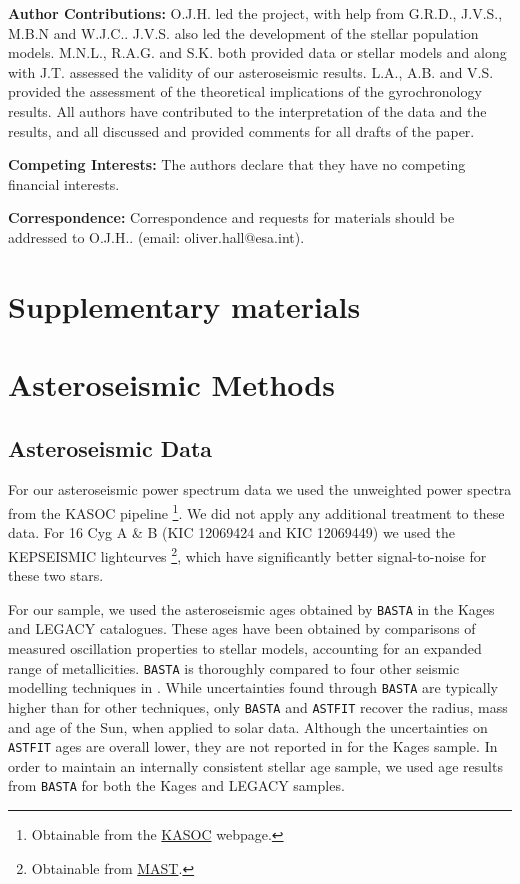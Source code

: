 \documentclass[12pt]{article}
\begin{document}
%

\textbf{Author Contributions:} O.J.H. led the project, with help from G.R.D., J.V.S., M.B.N and W.J.C.. J.V.S. also led the development of the stellar population models. M.N.L., R.A.G. and S.K. both provided data or stellar models and along with J.T. assessed the validity of our asteroseismic results. L.A., A.B. and V.S. provided the assessment of the theoretical implications of the gyrochronology results. All authors have contributed to the interpretation of the data and the results, and all discussed and provided comments for all drafts of the paper.

\textbf{Competing Interests:} The authors declare that they have no competing financial interests.

\textbf{Correspondence:} Correspondence and requests for materials should be addressed to O.J.H.. (email: oliver.hall@esa.int).

\clearpage

\section*{Supplementary materials}
\setcounter{tocdepth}{2}
\tableofcontents
\section{Asteroseismic Methods}
\subsection{Asteroseismic Data}
For our asteroseismic power spectrum data we used the unweighted power spectra from the KASOC pipeline \cite{handberg+lund2014}\footnote{Obtainable from the \href{http://kasoc.phys.au.dk/}{KASOC} webpage.}. We did not apply any additional treatment to these data. For 16 Cyg A \& B (KIC 12069424 and KIC 12069449) we used the KEPSEISMIC lightcurves \cite{garcia+2011}\footnote{Obtainable from \href{https://archive.
		stsci.edu/prepds/kepseismic/}{MAST}.}, which have significantly better signal-to-noise for these two stars.

For our sample, we used the asteroseismic ages obtained by \texttt{BASTA} \cite[BAyesian STellar Algorithm]{silvaaguirre+2015} in the Kages and LEGACY catalogues. These ages have been obtained by comparisons of measured oscillation properties to stellar models, accounting for an expanded range of metallicities. \texttt{BASTA} is thoroughly compared to four other seismic modelling techniques in \cite{silvaaguirre+2017}. While uncertainties found through \texttt{BASTA} are typically higher than for other techniques, only \texttt{BASTA} and \texttt{ASTFIT} \cite[Aarhus STellar Evolution Code]{christensen-dalsgaard2008} recover the radius, mass and age of the Sun, when applied to solar data. Although the uncertainties on \texttt{ASTFIT} ages are overall lower, they are not reported in \cite{silvaaguirre+2015} for the Kages sample. In order to maintain an internally consistent stellar age sample, we used age results from \texttt{BASTA} for both the Kages and LEGACY samples.
\end{document}
